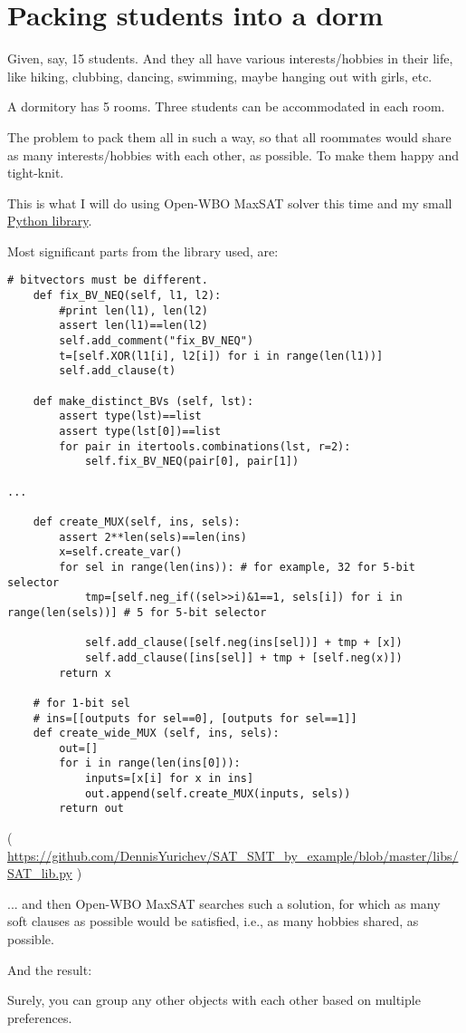 \section{Packing students into a dorm}

Given, say, 15 students.
And they all have various interests/hobbies in their life, like
hiking, clubbing, dancing, swimming, maybe hanging out with girls, etc.

A dormitory has 5 rooms.
Three students can be accommodated in each room.

The problem to pack them all in such a way, so that all roommates would
share as many interests/hobbies with each other, as possible.
To make them happy and tight-knit.

This is what I will do using Open-WBO MaxSAT solver this time
and my small \href{https://github.com/DennisYurichev/SAT_SMT_by_example/blob/master/libs/SAT_lib.py}{Python library}.



Most significant parts from the library used, are:

\begin{lstlisting}[style=custompy]
    # bitvectors must be different.
    def fix_BV_NEQ(self, l1, l2):
        #print len(l1), len(l2)
        assert len(l1)==len(l2)
        self.add_comment("fix_BV_NEQ")
        t=[self.XOR(l1[i], l2[i]) for i in range(len(l1))]
        self.add_clause(t)

    def make_distinct_BVs (self, lst):
        assert type(lst)==list
        assert type(lst[0])==list
        for pair in itertools.combinations(lst, r=2):
            self.fix_BV_NEQ(pair[0], pair[1])

...

    def create_MUX(self, ins, sels):
        assert 2**len(sels)==len(ins)
        x=self.create_var()
        for sel in range(len(ins)): # for example, 32 for 5-bit selector
            tmp=[self.neg_if((sel>>i)&1==1, sels[i]) for i in range(len(sels))] # 5 for 5-bit selector
   
            self.add_clause([self.neg(ins[sel])] + tmp + [x])
            self.add_clause([ins[sel]] + tmp + [self.neg(x)])
        return x
    
    # for 1-bit sel
    # ins=[[outputs for sel==0], [outputs for sel==1]]
    def create_wide_MUX (self, ins, sels):
        out=[]
        for i in range(len(ins[0])):
            inputs=[x[i] for x in ins]
            out.append(self.create_MUX(inputs, sels))
        return out
\end{lstlisting}
( \url{https://github.com/DennisYurichev/SAT_SMT_by_example/blob/master/libs/SAT_lib.py} )

... and then Open-WBO MaxSAT searches such a solution, for which as many
soft clauses as possible would be satisfied, i.e., as many hobbies shared,
as possible.

And the result:



Surely, you can group any other objects with each other based on multiple preferences.

